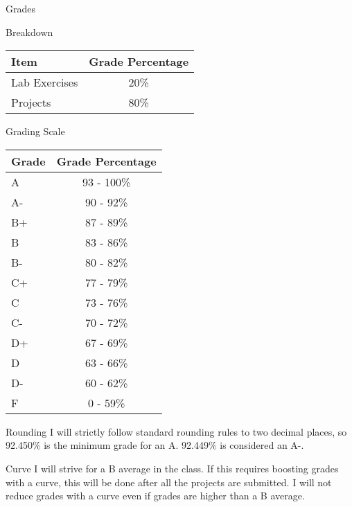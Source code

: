 \documentclass[11pt]{resume}
\begin{document}
\vspace{0.5cm}
\begin{section}{Grades}
\begin{subsection}{Breakdown}
\begin{center}
\begin{tabular}{lc}
\toprule
\textbf{Item} & \textbf{Grade Percentage}\\

\midrule
Lab Exercises & 20\%\\
Projects & 80\%\\

\bottomrule
\end{tabular}
\end{center}
\end{subsection}
\begin{subsection}{Grading Scale}
\begin{center}
\begin{tabular}{lc}
\toprule
\textbf{Grade} & \textbf{Grade Percentage}\\

\midrule
A & 93 - 100\%\\
A- & 90 - 92\%\\
B+ & 87 - 89\%\\
B & 83 - 86\%\\
B- & 80 - 82\%\\
C+ & 77 - 79\%\\
C & 73 - 76\%\\
C- & 70 - 72\%\\
D+ & 67 - 69\%\\
D & 63 - 66\%\\
D- & 60 - 62\%\\
F & 0 - 59\%\\

\bottomrule
\end{tabular}
\end{center}
\end{subsection}
\begin{subsection}{Rounding}
I will strictly follow standard rounding rules to two decimal places, so 92.450\% is the minimum grade for an
A. 92.449\% is considered an A-.
\end{subsection}
\begin{subsection}{Curve}
I will strive for a B average in the class. If this requires boosting grades with a curve, this will be done after
all the projects are submitted. I will not reduce grades with a curve even if grades are higher than a B average.
\end{subsection}
\end{section}
\end{document}
